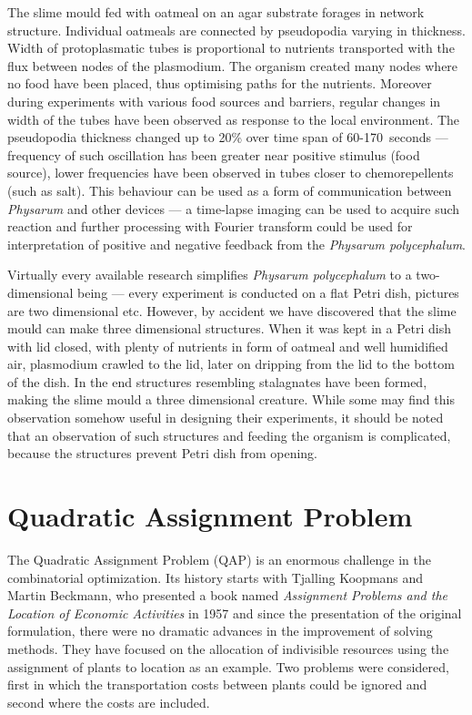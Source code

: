\documentclass[english,a4paper,twoside]{ppfcmthesis}
\begin{document}
The slime mould fed with oatmeal on an agar substrate forages in network structure. Individual oatmeals are connected by pseudopodia varying in thickness. Width of protoplasmatic tubes is proportional to nutrients transported with the flux between nodes of the plasmodium. The organism created many nodes where no food have been placed, thus optimising paths for the nutrients. Moreover during experiments with various food sources and barriers, regular changes in width of the tubes have been observed as response to the local environment. The pseudopodia thickness changed up to 20\% over time span of 60-170~seconds --- frequency of such oscillation has been greater near positive stimulus (food source), lower frequencies have been observed in tubes closer to chemorepellents (such as salt). This behaviour can be used as a form of communication between \textit{Physarum} and other devices --- a time-lapse imaging can be used to acquire such reaction and further processing with Fourier transform \cite{bracewell1965fourier} could be used for interpretation of positive and negative feedback from the \textit{Physarum polycephalum}.

Virtually every available research simplifies \textit{Physarum polycephalum} to a two-dimensional being --- every experiment is conducted on a flat Petri dish, pictures are two dimensional etc. However, by accident we have discovered that the slime mould can make three dimensional structures. When it was kept in a Petri dish with lid closed, with plenty of nutrients in form of oatmeal and well humidified air, plasmodium crawled to the lid, later on dripping from the lid to the bottom of the dish. In the end structures resembling stalagnates have been formed, making the slime mould a three dimensional creature. While some may find this observation somehow useful in designing their experiments, it should be noted that an observation of such structures and feeding the organism is complicated, because the structures prevent Petri dish from opening. 


\section{Quadratic Assignment Problem}
\label{section:background_qap}

The Quadratic Assignment Problem (QAP) is an enormous challenge in the combinatorial optimization.
Its history starts with Tjalling Koopmans and Martin Beckmann, who presented a book named \textit{Assignment Problems and the Location of Economic Activities} in 1957 \cite{koopmans-beckmann1957} and since the presentation of the original formulation, there were no dramatic advances in the improvement of solving methods.
They have focused on the allocation of indivisible resources using the assignment of plants to location as an example.
Two problems were considered, first in which the transportation costs between plants could be ignored and second where the costs are included.
\end{document}
